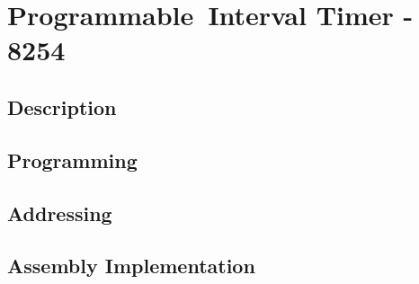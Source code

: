 \section{Programmable Interval Timer - 8254}

    \subsection{Description}

    \subsection{Programming}

    \subsection{Addressing}

    \subsection{Assembly Implementation}
